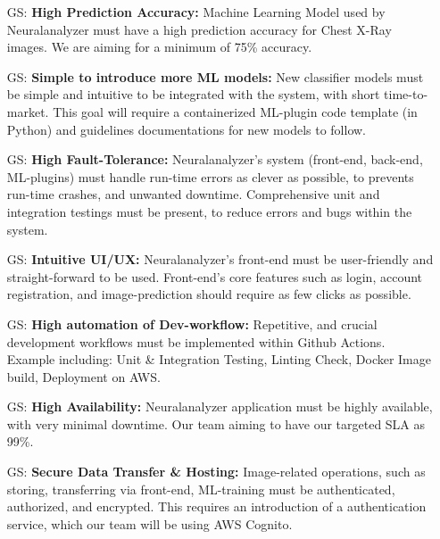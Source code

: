 \documentclass[12pt]{article}
\newcounter{goalnum} %
\begin{document}
\begin{itemize}

\item[GS\refstepcounter{goalnum}\thegoalnum \label{G_prediction_accuracy}:] \textbf{High Prediction Accuracy: }Machine Learning Model used by Neuralanalyzer must have a high prediction accuracy for Chest X-Ray images. We are aiming for a minimum of 75\% accuracy.
\item[GS\refstepcounter{goalnum}\thegoalnum \label{G_ease_of_ML_intro}:] \textbf{Simple to introduce more ML models: }New classifier models must be simple and intuitive to be integrated with the system, with short time-to-market. This goal will require a containerized ML-plugin code template (in Python) and guidelines documentations for new models to follow.
\item[GS\refstepcounter{goalnum}\thegoalnum \label{G_fault-tolerance}:] \textbf{High Fault-Tolerance: }Neuralanalyzer's system (front-end, back-end, ML-plugins) must handle run-time errors as clever as possible, to prevents run-time crashes, and unwanted downtime. Comprehensive unit and integration testings must be present, to reduce errors and bugs within the system.
\item[GS\refstepcounter{goalnum}\thegoalnum \label{G_good_UI}:] \textbf{Intuitive UI/UX: }Neuralanalyzer's front-end must be user-friendly and straight-forward to be used. Front-end's core features such as login, account registration, and image-prediction should require as few clicks as possible.
\item[GS\refstepcounter{goalnum}\thegoalnum \label{G_dev_work_automation}:] \textbf{High automation of Dev-workflow: }Repetitive, and crucial development workflows must be implemented within Github Actions. Example including: Unit \& Integration Testing, Linting Check, Docker Image build, Deployment on AWS.
\item[GS\refstepcounter{goalnum}\thegoalnum \label{G_avaialblity}:] \textbf{High Availability: }Neuralanalyzer application must be highly available, with very minimal downtime. Our team aiming to have our targeted SLA as 99\%.
\item[GS\refstepcounter{goalnum}\thegoalnum \label{G_data_security}:] \textbf{Secure Data Transfer \& Hosting: }Image-related operations, such as storing, transferring via front-end, ML-training must be authenticated, authorized, and encrypted. This requires an introduction of a authentication service, which our team will be using AWS Cognito.

\end{itemize}
\end{document}
